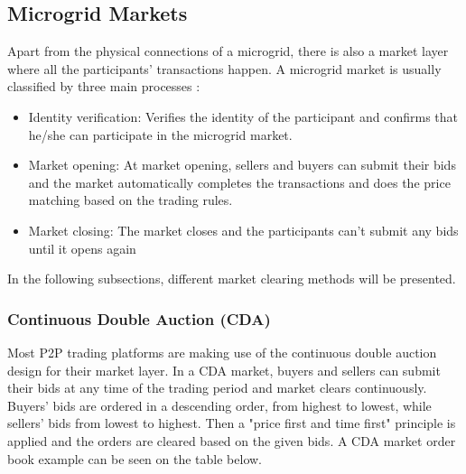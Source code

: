 \subsection{Microgrid Markets}
Apart from the physical connections of a microgrid, there is also a market layer where all the participants' transactions happen.
A microgrid market is usually classified by three main processes :
\begin{itemize}
    \item Identity verification: Verifies the identity of the participant and confirms that he/she can participate in the microgrid market.
    \item Market opening: At market opening, sellers and buyers can submit their bids and the market automatically completes the transactions
          and does the price matching based on the trading rules.
    \item Market closing: The market closes and the participants can't submit any bids until it opens again \cite{wang2017novel}
\end{itemize}

In the following subsections, different market clearing methods will be presented.

\subsubsection*{Continuous Double Auction (CDA)}
Most P2P trading platforms are making use of the continuous double auction design for their market layer.
In a CDA market, buyers and sellers can submit their bids at any time of the trading period and
market clears continuously. Buyers' bids are ordered in a descending order, from highest to lowest,
while sellers' bids from lowest to highest. Then a "price first and time first" principle is applied
and the orders are cleared based on the given bids. A CDA market order book example can be seen on the table below. \cite{wang2017novel,DeTrade}


